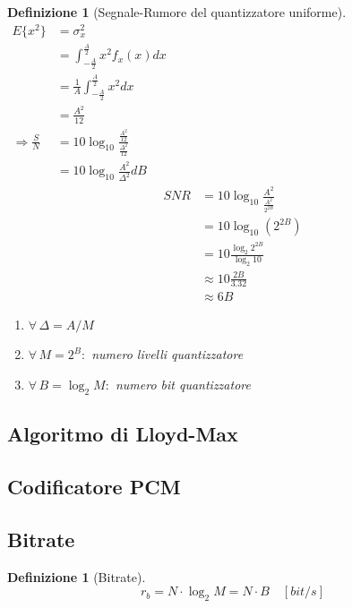 \documentclass[a4paper,10pt]{article}
\theoremstyle{mystyle}
\newtheorem{definition}[theorem]{Definizione}
\begin{document}
\begin{definition}[Segnale-Rumore del quantizzatore uniforme]
    \(
        \begin{aligned}
            E\{x^2\}
            &= \sigma_x^2 \\
            &= \int_{-\frac{A}{2}}^{\frac{A}{2}} x^2 f_x(x) dx \\
            &= \frac{1}{A} \int_{-\frac{A}{2}}^{\frac{A}{2}} x^2 dx \\
            &= \frac{A^2}{12} \\
            \Rightarrow \frac{S}{N}
            &=10 \log_{10} \frac{\frac{A^2}{12}}{\frac{\Delta ^2}{12}} \\
            &= 10 \log_{10} \frac{A^2}{\Delta ^2} dB
        \end{aligned}
    \)
    \[
        \begin{aligned}
            SNR
            &= 10 \log_{10} \frac{A^2}{\frac{A^2}{2^{2B}}} \\
            &= 10 \log_{10} (2^{2B})    \\
            &= 10 \frac{\log_2 2^{2B}}{\log_2 10} \\
            &\approx 10 \frac{2B}{3.32} \\
            &\approx 6 B
        \end{aligned}
    \]

    \begin{enumerate}[label=\roman*.]
        \item \(\forall \, \Delta =A/M\)
        \item \(\forall \, M=2^B:\) numero livelli quantizzatore
        \item \(\forall \, B=\log_2 M:\) numero bit quantizzatore
    \end{enumerate}
\end{definition}


\subsection{Algoritmo di Lloyd-Max}






\subsection{Codificatore PCM}

\subsection{Bitrate}
\begin{definition}[Bitrate]
    \[
        r_b= N \cdot \log_2 M = N \cdot B \hspace{1em} [bit/s]
    \]
\end{definition}
\end{document}
